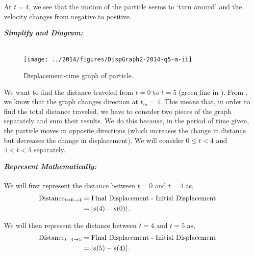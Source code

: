 \begin{subquestions}
\begin{subsubquestions}
		At $t=4$, we see that the motion of the particle seems to `turn around' and the velocity changes from negative to positive. 
		
		
		\subsubquestion
		
		
		\begin{subsubsubquestions}
			
			\subsubsubquestion
			
			\textbf{\textit{Simplify and Diagram:}} \\ \\
			
			\begin{figure}[H]
				\begin{center}
					\texttt{[image: ../2014/figures/DispGraph2-2014-q5-a-ii]}
					\caption{\label{2014:q5*:SGraph2} Displacement-time graph of particle.}
				\end{center}
			\end{figure}
			
			We want to find the distance traveled from $t=0$ to $t=5$ (green line in ). From , we know that the graph changes direction at $t_m=4$. This means that, in order to find the total distance traveled, we have to consider two pieces of the graph separately and sum their results. We do this because, in the period of time given, the particle moves in opposite directions (which increases the change in distance but decreases the change in displacement). We will consider $0 \leq t < 4$ and $4 < t < 5$ separately.
			
			
			
			\textbf{\textit{Represent Mathematically:}} \\ \\
			We will first represent the distance between $t=0$ and $t=4$ as,
			\begin{align}
				\text{Distance}_{t=0 \rightarrow 4} & = \text{Final Displacement - Initial Displacement} \nonumber \\
				& = |s(4)-s(0)| \,.  \label{2014:q5*:Seqn1}
			\end{align}
			
			We will then represent the distance between $t=4$ and $t=5$ as,
			\begin{align}
				\text{Distance}_{t=4 \rightarrow 5} & = \text{Final Displacement - Initial Displacement} \nonumber \\
				& = |s(5)-s(4)| \,.  \label{2014:q5*:Seqn2}
			\end{align}
			

\end{subsubsubquestions}
\end{subsubquestions}
\end{subquestions}
